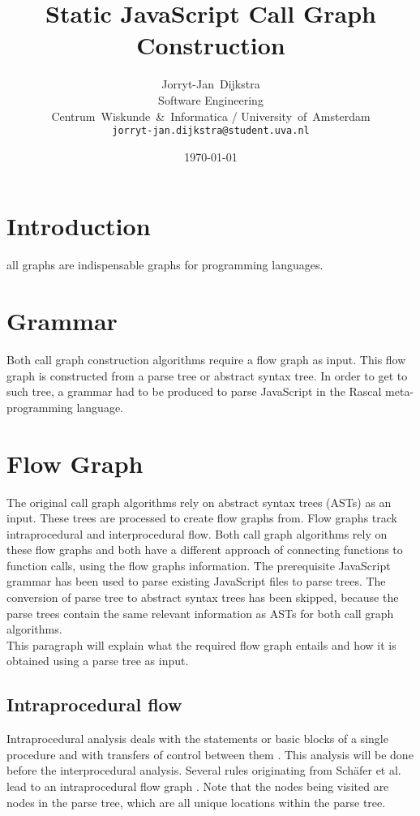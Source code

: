 \documentclass[journal,10pt]{IEEEtran}
\begin{document}
\title{Static JavaScript Call Graph Construction}
\author{Jorryt-Jan~Dijkstra \\ Software Engineering \\ Centrum~Wiskunde~\&~Informatica / University~of~Amsterdam \\ \texttt{jorryt-jan.dijkstra@student.uva.nl}}
\date{\today}

\maketitle


\section{Introduction}
all graphs are indispensable graphs for programming languages.

\section{Grammar}
Both call graph construction algorithms require a flow graph as input. This flow graph is constructed from a parse tree or abstract syntax tree. In order to get to such tree, a grammar had to be produced to parse JavaScript in the Rascal meta-programming language.

\section{Flow Graph}
The original call graph algorithms rely on abstract syntax trees (ASTs) as an input. These trees are processed to create flow graphs from. Flow graphs track intraprocedural and interprocedural flow. Both call graph algorithms rely on these flow graphs and both have a different approach of connecting functions to function calls, using the flow graphs information. 
The prerequisite JavaScript grammar has been used to parse existing JavaScript files to parse trees. The conversion of parse tree to abstract syntax trees has been skipped, because the parse trees contain the same relevant information as ASTs for both call graph algorithms. \\
This paragraph will explain what the required flow graph entails and how it is obtained using a parse tree as input.

\subsection{Intraprocedural flow}
Intraprocedural analysis deals with the statements or basic blocks of a single procedure and with transfers of control between them \cite[p. 3]{Marlowe:1990aa}. This analysis will be done before the interprocedural analysis. Several rules originating from Sch\"{a}fer et al. lead to an intraprocedural flow graph \cite[p. 5]{Feldthaus:2013}. Note that the nodes being visited are nodes in the parse tree, which are all unique locations within the parse tree.
\end{document}
